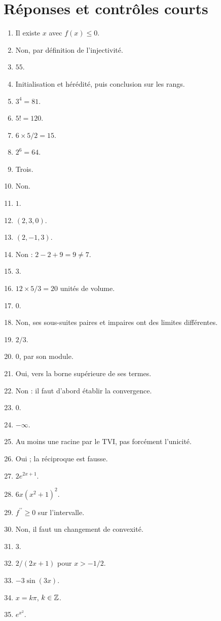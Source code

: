 \section{Réponses et contrôles courts}\begin{enumerate}
\item Il existe $x$ avec $f(x)\le0$.
\item Non, par définition de l’injectivité.
\item $55$.
\item Initialisation et hérédité, puis conclusion sur les rangs.
\item $3^4=81$.
\item $5!=120$.
\item $6\times5/2=15$.
\item $2^6=64$.
\item Trois.
\item Non.
\item $1$.
\item $(2,3,0)$.
\item $(2,-1,3)$.
\item Non : $2-2+9=9\ne7$.
\item $3$.
\item $12\times5/3=20$ unités de volume.
\item $0$.
\item Non, ses sous-suites paires et impaires ont des limites différentes.
\item $2/3$.
\item $0$, par son module.
\item Oui, vers la borne supérieure de ses termes.
\item Non : il faut d’abord établir la convergence.
\item $0$.
\item $-\infty$.
\item Au moins une racine par le TVI, pas forcément l’unicité.
\item Oui ; la réciproque est fausse.
\item $2e^{2x+1}$.
\item $6x(x^2+1)^2$.
\item $f^{\prime\prime}\ge0$ sur l’intervalle.
\item Non, il faut un changement de convexité.
\item $3$.
\item $2/(2x+1)$ pour $x>-1/2$.
\item $-3\sin(3x)$.
\item $x=k\pi$, $k\in\mathbb{Z}$.
\item $e^{x^2}$.

\end{enumerate}
